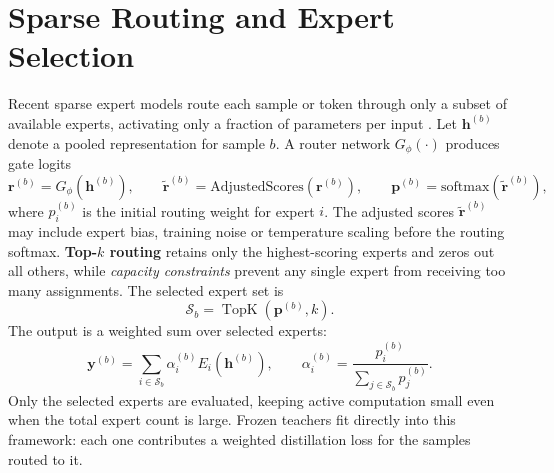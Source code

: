 \section{Sparse Routing and Expert Selection}
\label{sec:prelim-sparse-routing}

Recent sparse expert models route each sample or token through only a subset of
available experts, activating only a fraction of parameters per input
\cite{shazeer2017outrageouslylargeneuralnetworks,fedus2022switchtransformersscalingtrillion,deepseekai2024deepseekv2strongeconomicalefficient}. Let \(\mathbf{h}^{(b)}\) denote a pooled representation for sample \(b\).
A router network \(G_{\phi}(\cdot)\) produces gate logits
\begin{equation}
\mathbf{r}^{(b)} = G_{\phi}(\mathbf{h}^{(b)}),
\qquad
\tilde{\mathbf{r}}^{(b)} = \text{AdjustedScores}\!\left(\mathbf{r}^{(b)}\right),
\qquad
\mathbf{p}^{(b)} = \mathrm{softmax}\!\left(\tilde{\mathbf{r}}^{(b)}\right),
\end{equation}
where \(p_i^{(b)}\) is the initial routing weight for expert \(i\). The
adjusted scores \(\tilde{\mathbf{r}}^{(b)}\) may include expert bias, training
noise or temperature scaling before the routing softmax.
\textbf{Top-\(k\) routing} retains only the highest-scoring experts and zeros
out all others, while \textit{capacity constraints} prevent any single expert
from receiving too many assignments.
The selected expert set is
\[
\mathcal{S}_b=\operatorname{TopK}(\mathbf{p}^{(b)},k).
\]
The output is a weighted sum over selected experts:
\begin{equation}
\mathbf{y}^{(b)}
=
\sum_{i\in\mathcal{S}_b}
\alpha_i^{(b)}E_i(\mathbf{h}^{(b)}),
\qquad
\alpha_i^{(b)}
=
\frac{p_i^{(b)}}{\sum_{j\in\mathcal{S}_b}p_j^{(b)}}.
\end{equation}
Only the selected experts are evaluated, keeping active computation small even
when the total expert count is large. Frozen teachers fit directly into this framework: each one contributes a
weighted distillation loss for the samples routed to it.

